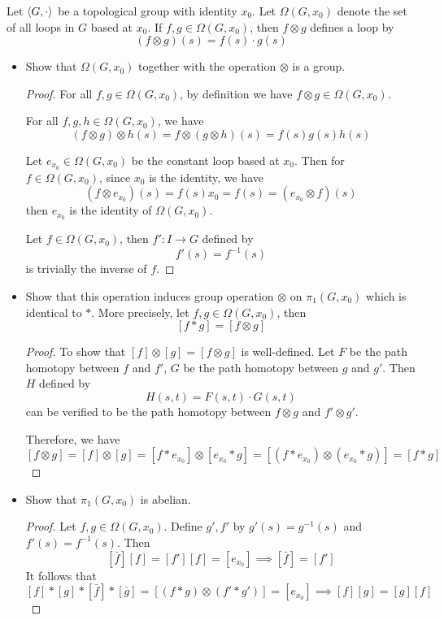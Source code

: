 \documentclass[12pt,a4paper]{article}
\begin{document}
    \begin{ex}
        Let $\langle G,\cdot \rangle$ be a topological group with identity $x_0$. Let $\Omega(G,x_0)$ denote the set of all loops in $G$ based at $x_0$. If $f,g\in \Omega(G,x_0)$, then $f\otimes g$ defines a loop by
        \[
            (f\otimes g)(s)=f(s)\cdot g(s)
        \]
        \begin{itemize}
            \item Show that $\Omega(G,x_0)$ together with the operation $\otimes$ is a group.
            \begin{proof}
                For all $f,g\in\Omega(G,x_0)$, by definition we have $f\otimes g\in \Omega(G,x_0)$.

                For all $f,g,h\in\Omega(G,x_0)$, we have
                \[
                    (f\otimes g)\otimes h(s)=f\otimes(g\otimes h)(s)=f(s)g(s)h(s)
                \]

                Let $e_{x_0}\in \Omega(G,x_0)$ be the constant loop based at $x_0$. Then for $f\in\Omega(G,x_0)$, since $x_0$ is the identity, we have
                \[
                    (f\otimes e_{x_0})(s)=f(s)x_0=f(s)=(e_{x_0}\otimes f)(s)
                \]
                then $e_{x_0}$ is the identity of $\Omega(G,x_0)$.

                Let $f\in \Omega(G,x_0)$, then $f':I\to G$ defined by
                \[
                    f'(s)=f^{-1}(s)
                \]
                is trivially the inverse of $f$.
            \end{proof}
            \item Show that this operation induces group operation $\otimes$ on $\pi_1(G,x_0)$ which is identical to $*$. More precisely, let $f,g\in\Omega(G,x_0)$, then
            \[
                [f*g]=[f\otimes g]
            \]
            \begin{proof}
                To show that $[f]\otimes [g]=[f\otimes g]$ is well-defined. Let $F$ be the path homotopy between $f$ and $f'$, $G$ be the path homotopy between $g$ and $g'$. Then $H$ defined by
                \[
                    H(s,t)=F(s,t)\cdot G(s,t)
                \]
                can be verified to be the path homotopy between $f\otimes g$ and $f'\otimes g'$.

                Therefore, we have
                \[
                    [f\otimes g]=[f]\otimes[g]=[f*e_{x_0}]\otimes[e_{x_0}*g]=[(f*e_{x_0})\otimes(e_{x_0}*g)]=[f*g]
                \]
            \end{proof}
            \item Show that $\pi_1(G,x_0)$ is abelian.
            \begin{proof}
                Let $f,g\in \Omega(G, x_0)$. Define $g',f'$ by $g'(s)=g^{-1}(s)$ and $f'(s)=f^{-1}(s)$. Then
                \[
                    [\bar{f}][f]=[f'][f]=[e_{x_0}]\implies [\bar{f}]=[f']
                \]
                It follows that
                \[
                    [f]*[g]*[\bar{f}]*[\bar{g}]=[(f*g)\otimes(f'*g')]=[e_{x_0}]\implies [f][g]=[g][f]
                \]
            \end{proof}
        \end{itemize}
    \end{ex}
    \bigskip
\end{document}
